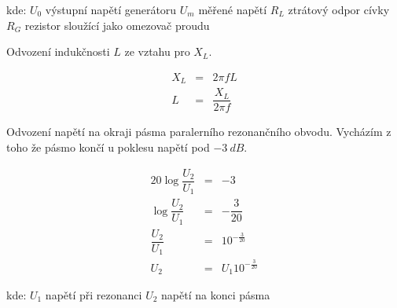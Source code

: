   \hspace*{2cm}kde:\newline        
  \hspace*{4cm}$U_0$ \dotfill výstupní napětí generátoru\hspace*{4cm}\newline
  \hspace*{4cm}$U_m$ \dotfill měřené napětí\hspace*{4cm}\newline
  \hspace*{4cm}$R_L$ \dotfill ztrátový odpor cívky\hspace*{4cm}\newline
  \hspace*{4cm}$R_G$ \dotfill rezistor sloužící jako omezovač proudu\hspace*{4cm}\newline
    
  Odvození indukčnosti $L$ ze vztahu pro $X_L$.
  
  \begin{eqnarray}
    X_L &=& 2\pi fL \nonumber\\
    L &=& \dfrac{X_L}{2\pi f}
  \end{eqnarray}
  
  Odvození napětí na okraji pásma paralerního rezonančního obvodu. Vycházím z toho že pásmo končí u poklesu napětí pod $-3~dB$.
  
  \begin{eqnarray}
    20\log\dfrac{U_2}{U_1} &=& -3 \nonumber\\
    \log \dfrac{U_2}{U_1} &=& -\dfrac{3}{20} \nonumber\\
    \dfrac{U_2}{U_1} &=& 10^{-\frac{3}{20}} \nonumber\\
    U_2 &=& U_1 10^{-\frac{3}{20}}
  \end{eqnarray}
    
  \hspace*{2cm}kde:\newline    
  \hspace*{4cm}$U_1$ \dotfill napětí při rezonanci\hspace*{4cm}\newline
  \hspace*{4cm}$U_2$ \dotfill napětí na konci pásma\hspace*{4cm}\newline
 
